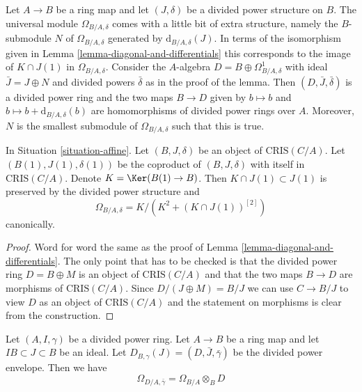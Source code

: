 \begin{remark}
\label{remark-filtration-differentials}
Let $A \to B$ be a ring map and let $(J, \delta)$ be a divided
power structure on $B$. The universal module $\Omega_{B/A, \delta}$
comes with a little bit of extra structure, namely the $B$-submodule
$N$ of $\Omega_{B/A, \delta}$ generated by $\text{d}_{B/A, \delta}(J)$.
In terms of the isomorphism given in
Lemma \ref{lemma-diagonal-and-differentials}
this corresponds to the image of
$K \cap J(1)$ in $\Omega_{B/A, \delta}$. Consider the $A$-algebra
$D = B \oplus \Omega^1_{B/A, \delta}$ with ideal $\bar J = J \oplus N$
and divided powers $\bar \delta$ as in the proof of the lemma.
Then $(D, \bar J, \bar \delta)$ is a divided power ring
and the two maps $B \to D$ given by $b \mapsto b$ and
$b \mapsto b + \text{d}_{B/A, \delta}(b)$
are homomorphisms of divided power rings over $A$. Moreover, $N$
is the smallest submodule of $\Omega_{B/A, \delta}$ such that this is true.
\end{remark}

\begin{lemma}
\label{lemma-diagonal-and-differentials-affine-site}
In Situation \ref{situation-affine}.
Let $(B, J, \delta)$ be an object of $\text{CRIS}(C/A)$.
Let $(B(1), J(1), \delta(1))$ be the coproduct of $(B, J, \delta)$
with itself in $\text{CRIS}(C/A)$. Denote
$K = \Ker(B(1) \to B)$. Then $K \cap J(1) \subset J(1)$
is preserved by the divided power structure and
$$
\Omega_{B/A, \delta} = K/ \left(K^2 + (K \cap J(1))^{[2]}\right)
$$
canonically.
\end{lemma}

\begin{proof}
Word for word the same as the proof of
Lemma \ref{lemma-diagonal-and-differentials}.
The only point that has to be checked is that the
divided power ring $D = B \oplus M$ is an object of $\text{CRIS}(C/A)$
and that the two maps $B \to D$ are morphisms of $\text{CRIS}(C/A)$.
Since $D/(J \oplus M) = B/J$ we can use $C \to B/J$ to view
$D$ as an object of $\text{CRIS}(C/A)$
and the statement on morphisms is clear from the construction.
\end{proof}

\begin{lemma}
\label{lemma-module-differentials-divided-power-envelope}
Let $(A, I, \gamma)$ be a divided power ring. Let $A \to B$ be a ring
map and let $IB \subset J \subset B$ be an ideal. Let
$D_{B, \gamma}(J) = (D, \bar J, \bar \gamma)$ be the divided power envelope.
Then we have
$$
\Omega_{D/A, \bar\gamma} = \Omega_{B/A} \otimes_B D
$$
\end{lemma}

